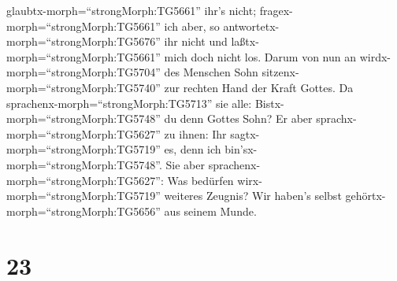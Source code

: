 glaubtx-morph=``strongMorph:TG5661'' ihr's nicht; 
fragex-morph=``strongMorph:TG5661'' ich aber, so
antwortetx-morph=``strongMorph:TG5676'' ihr nicht und
laßtx-morph=``strongMorph:TG5661'' mich doch nicht los. 
Darum von nun an wirdx-morph=``strongMorph:TG5704'' des Menschen Sohn
sitzenx-morph=``strongMorph:TG5740'' zur rechten Hand der Kraft Gottes.
 Da sprachenx-morph=``strongMorph:TG5713'' sie alle:
Bistx-morph=``strongMorph:TG5748'' du denn Gottes Sohn? Er aber
sprachx-morph=``strongMorph:TG5627'' zu ihnen: Ihr
sagtx-morph=``strongMorph:TG5719'' es, denn ich
bin'sx-morph=``strongMorph:TG5748''.  Sie aber
sprachenx-morph=``strongMorph:TG5627'': Was bedürfen
wirx-morph=``strongMorph:TG5719'' weiteres Zeugnis? Wir haben's selbst
gehörtx-morph=``strongMorph:TG5656'' aus seinem Munde.

\hypertarget{section-22}{%
\section{23}\label{section-22}}

